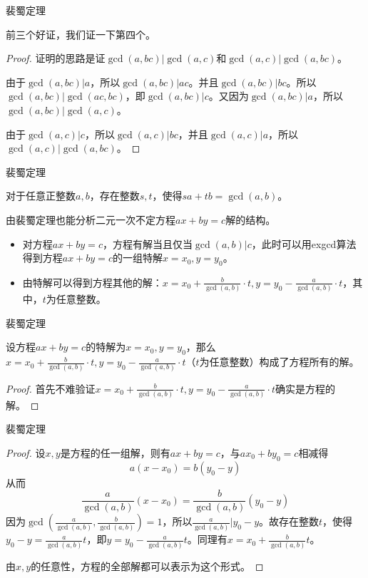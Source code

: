 \documentclass{ctexbeamer}        %
\begin{document}
\begin{frame}{裴蜀定理}

前三个好证，我们证一下第四个。

\begin{proof}
    证明的思路是证$\gcd(a,bc)|\gcd(a,c)$和$\gcd(a,c)|\gcd(a,bc)$。

    由于$\gcd(a,bc)|a$，所以$\gcd(a,bc)|ac$。并且$\gcd(a,bc)|bc$。所以$\gcd(a,bc)|\gcd(ac,bc)$，即$\gcd(a,bc)|c$。又因为$\gcd(a,bc)|a$，所以$\gcd(a,bc)|\gcd(a,c)$。

    由于$\gcd(a,c)|c$，所以$\gcd(a,c)|bc$，并且$\gcd(a,c)|a$，所以$\gcd(a,c)|\gcd(a,bc)$。
\end{proof}

\end{frame}

\begin{frame}{裴蜀定理}

\begin{theorem}[裴蜀定理]
    对于任意正整数$a,b$，存在整数$s,t$，使得$sa+tb=\gcd(a,b)$。
\end{theorem}

由裴蜀定理也能分析二元一次不定方程$ax+by=c$解的结构。

\begin{itemize}
    \item 对方程$ax+by=c$，方程有解当且仅当$\gcd(a,b)|c$，此时可以用exgcd算法得到方程$ax+by=c$的一组特解$x=x_0,y=y_0$。
    \item 由特解可以得到方程其他的解：$x=x_0+\frac{b}{\gcd(a,b)} \cdot t,y=y_0-\frac{a}{\gcd(a,b)} \cdot t$，其中，$t$为任意整数。
\end{itemize}

\end{frame}

\begin{frame}{裴蜀定理}

\begin{theorem}
    设方程$ax+by=c$的特解为$x=x_0,y=y_0$，那么$x=x_0+\frac{b}{\gcd(a,b)} \cdot t,y=y_0-\frac{a}{\gcd(a,b)} \cdot t$（$t$为任意整数）构成了方程所有的解。
\end{theorem}

\begin{proof}
    首先不难验证$x=x_0+\frac{b}{\gcd(a,b)} \cdot t,y=y_0-\frac{a}{\gcd(a,b)} \cdot t$确实是方程的解。
\end{proof}

\end{frame}

\begin{frame}{裴蜀定理}

\begin{proof}
    设$x,y$是方程的任一组解，则有$ax+by=c$，与$ax_0+by_0=c$相减得
    $$a(x-x_0)=b(y_0-y)$$
    从而
    $$\frac{a}{\gcd(a,b)}(x-x_0)=\frac{b}{\gcd(a,b)}(y_0-y)$$
    因为$\gcd(\frac{a}{\gcd(a,b)},\frac{b}{\gcd(a,b)})=1$，所以$\frac{a}{\gcd(a,b)}|y_0-y$。故存在整数$t$，使得$y_0-y=\frac{a}{\gcd(a,b)}t$，即$y=y_0-\frac{a}{\gcd(a,b)}t$。同理有$x=x_0+\frac{b}{\gcd(a,b)}t$。
    
    由$x,y$的任意性，方程的全部解都可以表示为这个形式。
\end{proof}

\end{frame}
\end{document}
